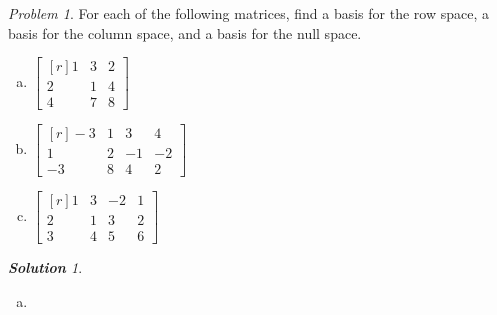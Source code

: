 \documentclass[12pt, letterpaper]{article}
\theoremstyle{remark}
\newtheorem{problem}{Problem}
\theoremstyle{remark}
\newtheorem*{solution}{\textbf{Solution}}
\begin{document}
\begin{problem}

For each of the following matrices, find a basis
for the row space, a basis for the column space,
and a basis for the null space.
\begin{enumerate}[(a)]

	\item \(
	      \begin{bmatrix*}[r]
		      1 & 3 & 2 \\
		      2 & 1 & 4 \\
		      4 & 7 & 8
	      \end{bmatrix*}
	      \)

	\item \(
	      \begin{bmatrix*}[r]
		      −3 & 1 & 3 & 4 \\
		      1 & 2 & −1 & −2 \\
		      −3 & 8 & 4 & 2
	      \end{bmatrix*}
	      \)

	\item \(
	      \begin{bmatrix*}[r]
		      1 & 3 & −2 & 1 \\
		      2 & 1 & 3 & 2 \\
		      3 & 4 & 5 & 6
	      \end{bmatrix*}
	      \)

\end{enumerate}

\end{problem}

\begin{solution}

	\begin{enumerate}[(a)]
		\item
	\end{enumerate}

\end{solution}
\end{document}

